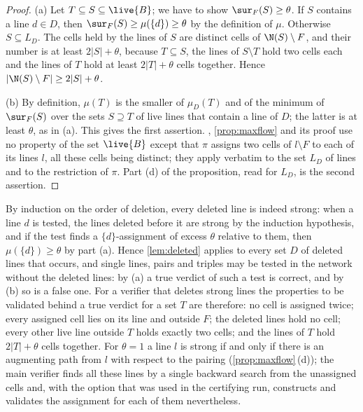 \begin{proof}
(a) Let $T\subseteq S\subseteq\live{B}$; we have to show $\sur_F(S)\ge\theta$. If $S$ contains a line
$d\in D$, then $\sur_F(S)\ge\mu(\{d\})\ge\theta$ by the definition of $\mu$. Otherwise $S\subseteq L_D$.
The cells held by the lines of $S$ are distinct cells of $\N(S)\setminus F$, and their number is at least
$2|S|+\theta$, because $T\subseteq S$, the lines of $S\setminus T$ hold two cells each and the lines of
$T$ hold at least $2|T|+\theta$ cells together. Hence $|\N(S)\setminus F|\ge 2|S|+\theta$.

(b) By definition, $\mu(T)$ is the smaller of $\mu_D(T)$ and of the minimum of $\sur_F(S)$ over the sets
$S\supseteq T$ of live lines that contain a line of $D$; the latter is at least $\theta$, as in (a). This
gives the first assertion. , \cref{prop:maxflow} and its proof use no property of
the set $\live{B}$ except that $\pi$ assigns two cells of $l\setminus F$ to each of its lines $l$, all
these cells being distinct; they apply verbatim to the set $L_D$ of lines and to the restriction of
$\pi$. Part (d) of the proposition, read for $L_D$, is the second assertion.
\end{proof}

By induction on the order of deletion, every deleted line is indeed strong: when a line $d$ is tested,
the lines deleted before it are strong by the induction hypothesis, and if the test finds a
$\{d\}$-assignment of excess $\theta$ relative to them, then $\mu(\{d\})\ge\theta$ by part (a). Hence
\cref{lem:deleted} applies to every set $D$ of deleted lines that occurs, and single lines, pairs and
triples may be tested in the network without the deleted lines: by (a) a true verdict of such a test is
correct, and by (b) so is a false one. For a verifier that deletes strong lines the properties to be
validated behind a true verdict for a set $T$ are therefore: no cell is assigned twice; every assigned
cell lies on its line and outside $F$; the deleted lines hold no cell; every other live line outside $T$
holds exactly two cells; and the lines of $T$ hold $2|T|+\theta$ cells together. For $\theta=1$ a line
$l$ is strong if and only if there is an augmenting path from $l$ with respect to the pairing
(\cref{prop:maxflow}\,(d)); the main verifier finds all these lines by a single backward search from the
unassigned cells and, with the option  that was used in the certifying run, constructs
and validates the assignment for each of them nevertheless.


